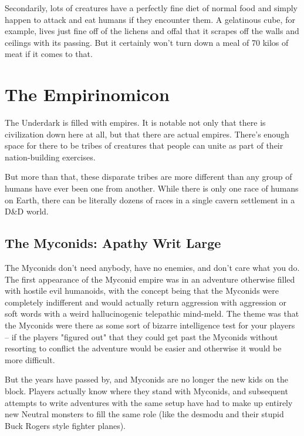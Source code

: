 Secondarily, lots of creatures have a perfectly fine diet of normal food and simply happen to attack and eat humans if they encounter them. A gelatinous cube, for example, lives just fine off of the lichens and offal that it scrapes off the walls and ceilings with its passing. But it certainly won't turn down a meal of 70 kilos of meat if it comes to that.

\section{The Empirinomicon}
\vspace*{-10pt}

The Underdark is filled with empires. It is notable not only that there is civilization down here at all, but that there are actual empires. There's enough space for there to be tribes of creatures that people can unite as part of their nation-building exercises.

But more than that, these disparate tribes are more different than any group of humans have ever been one from another. While there is only one race of humans on Earth, there can be literally dozens of races in a single cavern settlement in a D\&D world.

\subsection{The Myconids: Apathy Writ Large}

The Myconids don't need anybody, have no enemies, and don't care what you do. The first appearance of the Myconid empire was in an adventure otherwise filled with hostile evil humanoids, with the concept being that the Myconids were completely indifferent and would actually return aggression with aggression or soft words with a weird hallucinogenic telepathic mind-meld. The theme was that the Myconids were there as some sort of bizarre intelligence test for your players -- if the players "figured out" that they could get past the Myconids without resorting to conflict the adventure would be easier and otherwise it would be more difficult.

But the years have passed by, and Myconids are no longer the new kids on the block. Players actually know where they stand with Myconids, and subsequent attempts to write adventures with the same setup have had to make up entirely new Neutral monsters to fill the same role (like the desmodu and their stupid Buck Rogers style fighter planes).


